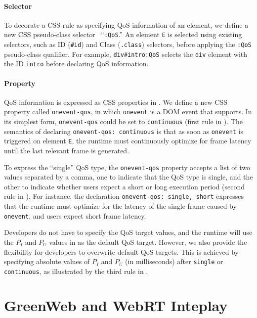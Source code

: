\paragraph{Selector} To decorate a CSS rule as specifying QoS information of an element, we define a new CSS pseudo-class selector~\cite{css_pseudo_class} ``\texttt{:QoS}.'' An element \texttt{E} is selected using existing selectors, such as ID (\texttt{\#id}) and Class (\texttt{.class}) selectors, before applying the \texttt{:QoS} pseudo-class qualifier. For example, \texttt{div\#intro:QoS} selects the \texttt{div} element with the ID \texttt{intro} before declaring QoS information.

\paragraph{Property} QoS information is expressed as CSS properties in \greenweb. We define a new CSS property called \texttt{onevent-qos}, in which \texttt{onevent} is a DOM event that \greenweb supports. In its simplest form, \texttt{onevent-qos} could be set to \texttt{continuous} (first rule in ). The semantics of declaring \texttt{onevent-qos: continuous} is that as soon as \texttt{onevent} is triggered on element \texttt{E}, the runtime must continuously optimize for frame latency until the last relevant frame is generated.

To express the ``single'' QoS type, the \texttt{onevent-qos} property accepts a list of two values separated by a comma, one to indicate that the QoS type is single, and the other to indicate whether users expect a short or long execution period (second rule in ). For instance, the declaration \texttt{onevent-qos: single, short} expresses that the runtime must optimize for the latency of the single frame caused by \texttt{onevent}, and users expect short frame latency.

Developers do not have to specify the QoS target values, and the \greenweb runtime will use the $P_I$ and $P_U$ values in  as the default QoS target. However, we also provide the flexibility for developers to overwrite default QoS targets. This is achieved by specifying absolute values of $P_I$ and $P_U$ (in milliseconds) after \texttt{single} or \texttt{continuous}, as illustrated by the third rule in .

\section{GreenWeb and WebRT Inteplay}
\label{sec:lang:inter}

